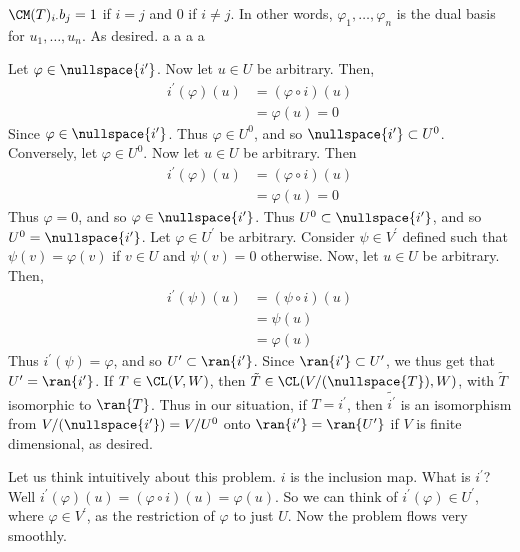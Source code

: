 \documentclass{book}
\begin{document}
\begin{enumerate}[label=\arabic*)]
      $\CM(T)_{i\cdot}b_j = 1$ if $i = j$ and $0$ if $i \neq j$. In other words, $\varphi_1, \dots, \varphi_n$ is the dual basis for $u_1, \dots, u_n$. As desired.
    \ii
    a
    \ii
    a
    \ii
    a
    \ii
    a
    \ii
      \begin{enumerate}[label=\alph*)]
        \ii 
          Let $\varphi \in \nullspace{i^{\prime}}$. Now let $u \in U$ be arbitrary. Then,
          \begin{align*}
            i^{\prime}(\varphi)(u) & = (\varphi \circ i)(u) \\
            & = \varphi(u) = 0
          \end{align*}
          Since $\varphi \in \nullspace{i^{\prime}}$. Thus $\varphi \in U^0$, and so $\nullspace{i^{\prime}} \subset U^0$. Conversely, let $\varphi \in U^0$. Now let $u \in U$ be arbitrary. Then
          \begin{align*}
            i^{\prime}(\varphi)(u) & = (\varphi \circ i)(u) \\
            & = \varphi(u) = 0
          \end{align*}
          Thus $\varphi = 0$, and so $\varphi \in \nullspace{i^{\prime}}$. Thus $U^0 \subset \nullspace{i^{\prime}}$, and so $U^0 = \nullspace{i^{\prime}}$.
        \ii 
          Let $\varphi \in U^{\prime}$ be arbitrary. Consider $\psi \in V^{\prime}$ defined such that $\psi(v) = \varphi(v)$ if $v \in U$ and $\psi(v) = 0$ otherwise. Now, let $u \in U$ be
          arbitrary. Then,
          \begin{align*}
            i^{\prime}(\psi)(u) & = (\psi \circ i)(u) \\
            & = \psi(u) \\
            & = \varphi(u)
          \end{align*}
          Thus $i^{\prime}(\psi) = \varphi$, and so $U^{\prime} \subset \ran{i^{\prime}}$. Since $\ran{i^{\prime}} \subset U^{\prime}$, we thus get that $U^{\prime} = \ran{i^{\prime}}$.
        \ii 
          If $T \in \CL(V, W)$, then $\tilde{T} \in \CL(V/(\nullspace{T}), W)$, with $\tilde{T}$ isomorphic to $\ran{T}$. Thus in our situation, if $T = i^{\prime}$, then $\tilde{i^{\prime}}$
          is an isomorphism from $V/(\nullspace{i^{\prime}}) = V/U^0$ onto $\ran{i^{\prime}} = \ran{U^{\prime}}$ if $V$ is finite dimensional, as desired.
      \end{enumerate}
      Let us think intuitively about this problem. $i$ is the inclusion map. What is $i^{\prime}$? Well $i^{\prime}(\varphi)(u) = (\varphi \circ i)(u) = \varphi(u)$. So we can think of
      $i^{\prime}(\varphi) \in U^{\prime}$, where $\varphi \in V^{\prime}$, as the restriction of $\varphi$ to just $U$. Now the problem flows very smoothly. 


\end{enumerate}
\end{document}
